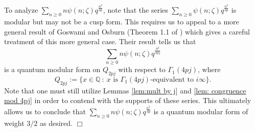 \documentclass[11pt,letterpaper]{amsart}
\theoremstyle{definition}
\theoremstyle{plain}
\numberwithin{equation}{section}
\theoremstyle{example}
\begin{document}
To analyze $\displaystyle{\sum_{n \geq 0} n \psi(n;\zeta)q^\frac{n^2}{4p}}$, note that the series $\displaystyle{\sum_{n \geq 0} \psi(n;\zeta)q^\frac{n^2}{4p}}$ is modular but may not be a cusp form. This requires us to appeal to a more general result of Goswami and Osburn (Theorem 1.1 of \cite{goswamiosburn}) which gives a careful treatment of this more general case. Their result tells us that 
\[\sum_{n \geq 0} n \psi(n;\zeta)q^\frac{n^2}{4pj}
\]
is a quantum modular form on $Q_{2pj}$ with respect to $\Gamma_1(4pj)$, where
\[Q_{2pj} := \{x \in \mathbb{Q} \ : \ x \text{ is } \Gamma_1(4pj)\text{-equivalent to } i\infty\}.
\]
Note that one must still utilize Lemmas \ref{lem:mult by j} and \ref{lem: congruence mod 4pj} in order to contend with the supports of these series.
This ultimately allows us to conclude that $\sum_{n \geq 0} n \psi(n;\zeta)q^\frac{n^2}{4p}$ is a quantum modular form of weight $3/2$ as desired.
$\Box$



\end{document}
